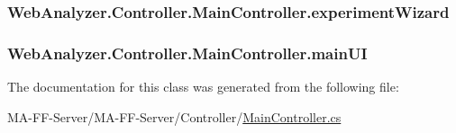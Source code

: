 \subsubsection[{experiment\+Wizard}]{ Web\+Analyzer.\+Controller.\+Main\+Controller.\+experiment\+Wizard\hspace{0.3cm}{\ttfamily [private]}}\label{class_web_analyzer_1_1_controller_1_1_main_controller_ae26ccfce4545f36905f855621e0a36dc}
\hypertarget{class_web_analyzer_1_1_controller_1_1_main_controller_a70cf415b6537ad91455f3b9b450df036}{}
\subsubsection[{main\+U\+I}]{ Web\+Analyzer.\+Controller.\+Main\+Controller.\+main\+U\+I\hspace{0.3cm}{\ttfamily [private]}}\label{class_web_analyzer_1_1_controller_1_1_main_controller_a70cf415b6537ad91455f3b9b450df036}


The documentation for this class was generated from the following file\+:\begin{DoxyCompactItemize}
\item 
M\+A-\/\+F\+F-\/\+Server/\+M\+A-\/\+F\+F-\/\+Server/\+Controller/\hyperlink{_main_controller_8cs}{Main\+Controller.\+cs}\end{DoxyCompactItemize}
